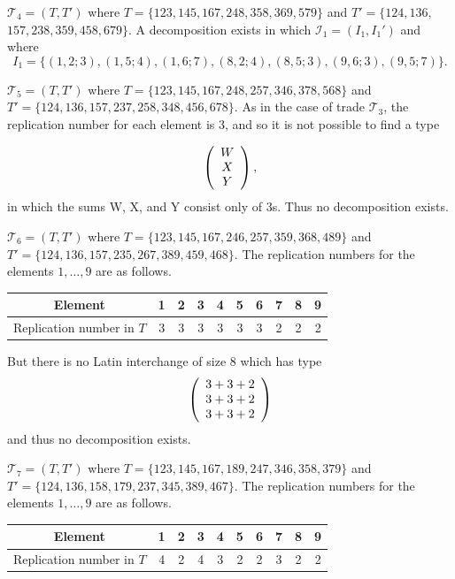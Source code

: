 \documentclass[12pt]{report}
\begin{document}
 ${\mathcal T}_4=(T,T')$ 
where $T=\{1 2 3,1 4 5,1 6 7,2 4 8,3 5 8,3 6 9,5 7 9\}$ and 
$T'=\{1 2 4,1 3 6,$ $1 5 7,2 3 8,3 5 9,4 5 8,6 7 9\}$.
A decomposition exists in which 
$\mathcal{I}_1 = (I_1,I_1')$ and where
\[I_1 =\{(1, 2; 3),(1, 5; 4),(1, 6; 7),(8, 2; 4),(8, 5; 3),
(9, 6; 3),(9,5;7)\}.\]

  ${\mathcal T}_5=(T,T')$ where 
$T=\{1 2 3,1 4 5,1 6 7,2 4 8,2 5 7,3 4 6,3 7 8,
5 6 8\}$ and
$T'=\{1 2 4,1 3 6,1 5 7,2 3 7,2 5 8,3 4 8,4 5 6,6 7 8\}$.
As in the case of trade ${\mathcal T}_3$, the replication number for each element is 3,
and so it is not possible to find a type 

\begin{eqnarray*}
\left(
\begin{array}{c}
    W\cr
X\\
Y
\end{array}
\right),
\end{eqnarray*}
in which the sums W, X, and Y consist only of 3s. 
Thus no decomposition exists.
\vspace{.5cm}

 ${\mathcal T}_6=(T,T')$ 
where $T=\{1 2 3,1 4 5,1 6 7,2 4 6,2 5 7,3 5 9,3 6 8,
4 8 9\}$ and
$T'=\{1 2 4,1 3 6,1 5 7,2 3 5,2 6 7,3 8 9,4 5 9,4 6 8\}$.
The replication numbers for the elements $1,\ldots,9$ are as follows.
\begin{center}
\begin{tabular}{c|c|c|c|c|c|c|c|c|c}
Element             & 1 & 2 & 3 & 4 & 5 & 6 & 7 & 8 & 9 \\
			  \hline
 Replication  number in $T$ & 3 & 3 & 3 & 3 & 3 & 3 & 2 & 2 & 2 \\
\end{tabular}
\end{center}
But there is no Latin interchange of size 8 which has type
\begin{eqnarray*}
\left(
\begin{array}{c}
    3+3+2\cr
3+3+2\\
3+3+2
\end{array}
\right)
\end{eqnarray*}
and thus no decomposition exists.
\vspace{.5cm}

 ${\mathcal T}_7=(T,T')$ 
where $T=\{1 2 3,1 4 5,1 6 7,1 8 9,2 4 7,3 4 6,3 5 8,
3 7 9\}$ and
$T'=\{1 2 4,1 3 6,1 5 8,1 7 9,2 3 7,3 4 5,3 8 9,4 6 7\}$.
The replication numbers for the elements $1,\dots, 9$ are as follows.
\begin{center}
\begin{tabular}{c|c|c|c|c|c|c|c|c|c}
Element              & 1 & 2 & 3 & 4 & 5 & 6 & 7 & 8 & 9 \\
			  \hline
 Replication  number in $T$ & 4 & 2 & 4 & 3 & 2 & 2 & 3 & 2 & 2
\end{tabular}
\end{center}
\end{document}
